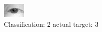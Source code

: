 \begin{figure}[h!]
\begin{center}
\includegraphics[width=0.60\columnwidth]{figures/ID1135_class_2_target_3.png}
\end{center}
\caption{ Classification: 2 actual target: 3}
\label{fig:ID1135_class_2_target_3}
\end{figure}
